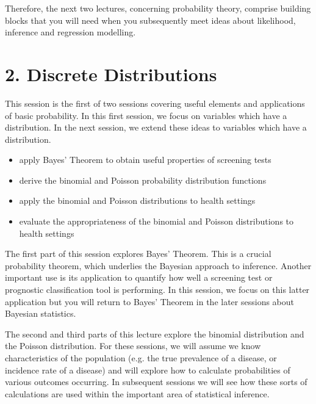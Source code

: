 \documentclass[letterpaper,10pt,english]{jupyterBook}
\begin{document}
\sphinxAtStartPar
Therefore, the next two lectures, concerning probability theory, comprise building blocks that you will need when you subsequently meet ideas about likelihood, inference and regression modelling.


\chapter{2. Discrete Distributions}
\label{\detokenize{02.a. Probability.Discrete:discrete-distributions}}\label{\detokenize{02.a. Probability.Discrete::doc}}
\sphinxAtStartPar
This session is the first of two sessions covering useful elements and applications of basic probability. In this first session, we focus on variables which have a  distribution. In the next session, we extend these ideas to variables which have a  distribution.


\begin{itemize}
\item {} 
\sphinxAtStartPar
apply Bayes’ Theorem to obtain useful properties of screening tests

\item {} 
\sphinxAtStartPar
derive the binomial and Poisson probability distribution functions

\item {} 
\sphinxAtStartPar
apply the binomial and Poisson distributions to health settings

\item {} 
\sphinxAtStartPar
evaluate the appropriateness of the binomial and Poisson distributions to health settings

\end{itemize}



\sphinxAtStartPar
The first part of this session explores Bayes’ Theorem. This is a crucial probability theorem, which underlies the Bayesian approach to inference. Another important use is its application to quantify how well a screening test or prognostic classification tool is performing. In this session, we focus on this latter application but you will return to Bayes’ Theorem in the later sessions about Bayesian statistics.

\sphinxAtStartPar
The second and third parts of this lecture explore the binomial distribution and the Poisson distribution. For these sessions, we will assume we know characteristics of the population (e.g. the true prevalence of a disease, or incidence rate of a disease) and will explore how to calculate probabilities of various outcomes occurring. In subsequent sessions we will see how these sorts of calculations are used within the important area of statistical inference.
\end{document}

